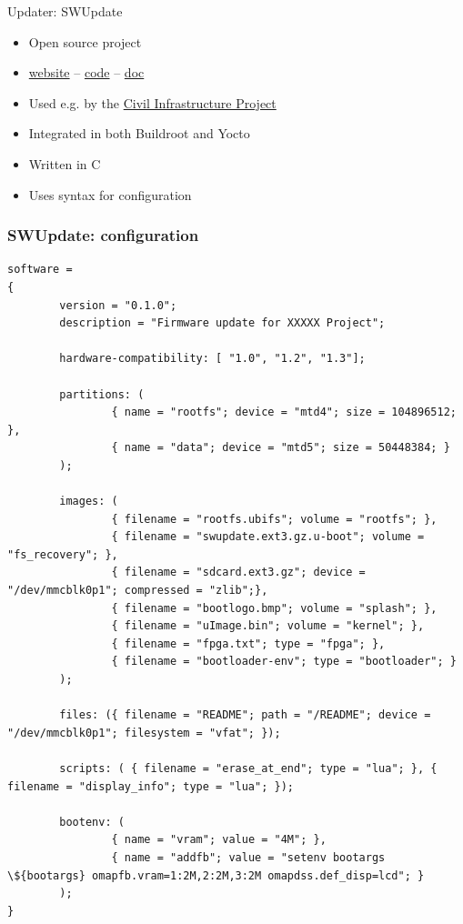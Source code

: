 \begin{frame}{Updater: SWUpdate}
  \begin{itemize}
    \item Open source project
    \item \href{https://swupdate.org/}{website} -- \href{https://github.com/sbabic/swupdate}{code} --  \href{https://sbabic.github.io/swupdate/index.html}{doc}
    \item Used e.g. by the \href{https://cip-project.org/}{Civil Infrastructure Project}
    \item Integrated in both Buildroot and Yocto
    \item Written in C
    \item Uses  syntax for configuration
  \end{itemize}
\end{frame}

\begin{frame}[fragile]
  \frametitle{SWUpdate: configuration}
  \begin{verbatim}
software =
{
        version = "0.1.0";
        description = "Firmware update for XXXXX Project";

        hardware-compatibility: [ "1.0", "1.2", "1.3"];

        partitions: (
                { name = "rootfs"; device = "mtd4"; size = 104896512; },
                { name = "data"; device = "mtd5"; size = 50448384; }
        );

        images: (
                { filename = "rootfs.ubifs"; volume = "rootfs"; },
                { filename = "swupdate.ext3.gz.u-boot"; volume = "fs_recovery"; },
                { filename = "sdcard.ext3.gz"; device = "/dev/mmcblk0p1"; compressed = "zlib";},
                { filename = "bootlogo.bmp"; volume = "splash"; },
                { filename = "uImage.bin"; volume = "kernel"; },
                { filename = "fpga.txt"; type = "fpga"; },
                { filename = "bootloader-env"; type = "bootloader"; }
        );

        files: ({ filename = "README"; path = "/README"; device = "/dev/mmcblk0p1"; filesystem = "vfat"; });

        scripts: ( { filename = "erase_at_end"; type = "lua"; }, { filename = "display_info"; type = "lua"; });

        bootenv: (
                { name = "vram"; value = "4M"; },
                { name = "addfb"; value = "setenv bootargs \${bootargs} omapfb.vram=1:2M,2:2M,3:2M omapdss.def_disp=lcd"; }
        );
}
  \end{verbatim}
\end{frame}

